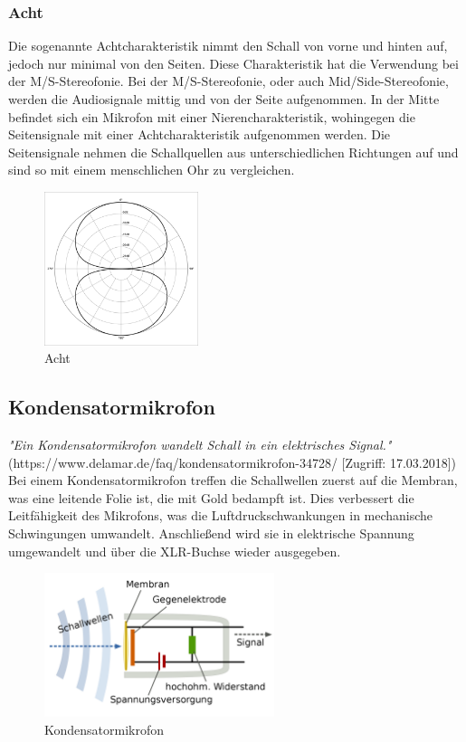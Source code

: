 \subsubsection{Acht}
Die sogenannte Achtcharakteristik nimmt den Schall von vorne und hinten auf, jedoch nur minimal von den Seiten. Diese Charakteristik hat die Verwendung bei der M/S-Stereofonie.\citep{kugel}\newline
Bei der M/S-Stereofonie, oder auch Mid/Side-Stereofonie, werden die Audiosignale mittig und von der Seite aufgenommen. In der Mitte befindet sich ein Mikrofon mit einer Nierencharakteristik, wohingegen die Seitensignale mit einer Achtcharakteristik aufgenommen werden. Die Seitensignale nehmen die Schallquellen aus unterschiedlichen Richtungen auf und sind so mit einem menschlichen Ohr zu vergleichen.\citep{ms}
\begin{figure}[H]
	\centering
	\includegraphics[width=0.4\textwidth]{abb7} 
	\caption[Acht]{Acht\footnotemark}
\end{figure}
\subsection{Kondensatormikrofon}
\textit{"Ein Kondensatormikrofon wandelt Schall in ein elektrisches Signal."}(https://www.delamar.de/faq/kondensatormikrofon-34728/ [Zugriff: 17.03.2018])\newline
Bei einem Kondensatormikrofon treffen die Schallwellen zuerst auf die Membran, was eine leitende Folie ist, die mit Gold bedampft ist. Dies verbessert die  Leitfähigkeit des Mikrofons, was die Luftdruckschwankungen in mechanische Schwingungen umwandelt. Anschließend wird sie in elektrische Spannung umgewandelt und über die XLR-Buchse wieder ausgegeben.\citep{kondensator}
\begin{figure}[H]
	\centering
	\includegraphics[width=0.6\textwidth]{abb8} 
	\caption[Kondensatormikrofon]{Kondensatormikrofon\footnotemark}
\end{figure}
